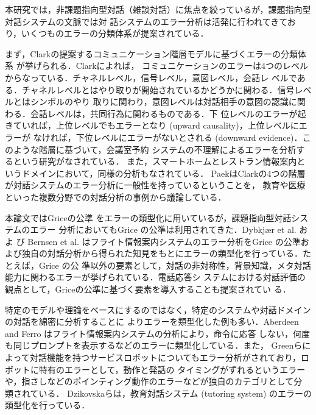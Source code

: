 \documentclass[japanese]{jnlp_1.4}
\begin{document}
本研究では，非課題指向型対話（雑談対話）に焦点を絞っているが，課題指向型対話システムの文脈では対
話システムのエラー分析は活発に行われてきており，いくつものエラーの分類体系が提案されている．

まず，Clarkの提案するコミュニケーション階層モデルに基づくエラーの分類体系\cite{clark1996using}
が挙げられる．Clarkによれば，
コミュニケーションのエラーは4つのレベルからなっている．チャネルレベル，信号レベル，意図レベル，会話レ
ベルである．チャネルレベルとはやり取りが開始されているかどうかに関わる．信号レベルとはシンボルのやり
取りに関わり，意図レベルは対話相手の意図の認識に関わる．会話レベルは，共同行為に関わるものである．下
位レベルのエラーが起きていれば，上位レベルでもエラーとなり (upward causality)，上位レベルにエラーが
なければ，下位レベルにエラーがないとされる (downward evidence)．このような階層に基づいて，会議室予約
システムの不理解によるエラーを分析するという研究がなされている\cite{bohus2005sorry}．
また，スマートホームとレストラン情報案内というドメインにおいて，同様の分析もなされている\cite{moller2007analysis}．
PaekはClarkの4つの階層が対話システムのエラー分析に一般性を持っているということを，
教育や医療といった複数分野での対話分析の事例から議論している\cite{paek2003toward}．

本論文ではGriceの公準\cite{gri:log} をエラーの類型化に用いているが，課題指向型対話システムのエラー
分析においてもGrice の公準は利用されてきた．Dybkj{\ae}r et al.  およ
び Bernsen et al.  はフライト情報案内システムのエラー分析をGrice 
の公準および独自の対話分析から得られた知見をもとにエラーの類型化を行っている．たとえば，Grice の公
準以外の要素として，対話の非対称性，背景知識，メタ対話能力に関わるエラーが挙げられている．電話応答シ
ステムにおける対話評価の観点として，Griceの公準に基づく要素を導入することも提案されてい
る\cite{moller2005parameters}．

特定のモデルや理論をベースにするのではなく，特定のシステムや対話ドメインの対話を綿密に分析することに
よりエラーを類型化した例も多い．Aberdeen and Ferro はフライト情報案内システムの分析により，命令に応答
しない，何度も同じプロンプトを表示するなどのエラーに類型化している\cite{aberdeen2003}．また，
Greenらによって対話機能を持つサービスロボットについてもエラー分析がされており，ロボットに特有のエラーとして，動作と発話の
タイミングがずれるというエラーや，指さしなどのポインティング動作のエラーなどが独自のカテゴリとして分
類されている\cite{green2006integrating}．
Dzikovskaらは，教育対話システム (tutoring system) のエラーの類型化を行っている\cite{dzikovska2009dealing}．
\end{document}

